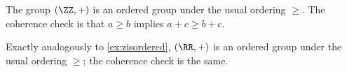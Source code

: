 \begin{example} \label{ex:zisordered}
	The group $(\ZZ,+)$ is an ordered group under the usual ordering $\ge$. The coherence check is that $a\ge b$ implies $a+c\ge b+c$.
\end{example}
\begin{example}
	Exactly analogously to \autoref{ex:zisordered}, $(\RR,+)$ is an ordered group under the usual ordering $\ge$; the coherence check is the same.
\end{example}
	


			
